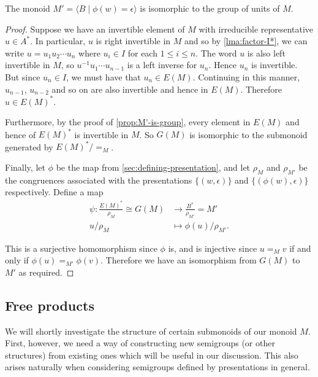 \documentclass[noindex,noinsetproof,12pt]{lmaths}
\begin{document}
\begin{theorem} \label{thm:Mdash-is-group-of-units}
	The monoid $M' = \langle B \mid \phi(w) = \epsilon \rangle$ is isomorphic to the group of units of $M$.
\end{theorem}
\begin{proof}
	Suppose we have an invertible element of $M$ with irreducible representative $u \in A^*$. In particular, $u$ is right invertible in $M$ and so by \cref{lma:factor-I*}, we can write $u = u_1u_2\cdots u_n$ where $u_i \in I$ for each $1 \le i \le n$. The word $u$ is also left invertible in $M$, so $u^{-1}u_1\cdots u_{n-1}$ is a left inverse for $u_n$.
	Hence $u_n$ is invertible. But since $u_n \in I$, we must have that $u_n \in E(M)$. Continuing in this manner, $u_{n-1}$, $u_{n-2}$ and so on are also invertible and hence in $E(M)$. Therefore $u \in E(M)^*$.

	Furthermore, by the proof of \cref{prop:M'-is-group}, every element in $E(M)$ and hence of $E(M)^*$ is invertible in $M$. So $G(M)$ is isomorphic to the submonoid generated by $E(M)^*/{=_M}$.

	Finally, let $\phi$ be the map from \cref{sec:defining-presentation}, and let $\rho_M$ and $\rho_{M'}$ be the congruences associated with the presentations $\{(w, \epsilon)\}$ and $\{(\phi(w), \epsilon)\}$ respectively. Define a map
	\begin{align*}
		\psi : \frac{E(M)^*}{\rho_M} \cong G(M) &\to \frac{B^*}{\rho_{M'}} = M' \\
		u/\rho_M &\mapsto \phi(u)/\rho_{M'}.
	\end{align*}

	This is a surjective homomorphism since $\phi$ is, and is injective since $u =_M v$ if and only if $\phi(u) =_{M'} \phi(v)$. Therefore we have an isomorphism from $G(M)$ to $M'$ as required.
\end{proof}


\subsection{Free products}

We will shortly investigate the structure of certain submonoids of our monoid $M$. First, however, we need a way of constructing new semigroups (or other structures) from existing ones which will be useful in our discussion. This  also arises naturally when considering semigroups defined by presentations in general.
\end{document}
